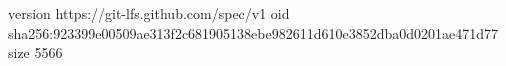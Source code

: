 version https://git-lfs.github.com/spec/v1
oid sha256:923399e00509ae313f2c681905138ebe982611d610e3852dba0d0201ae471d77
size 5566
